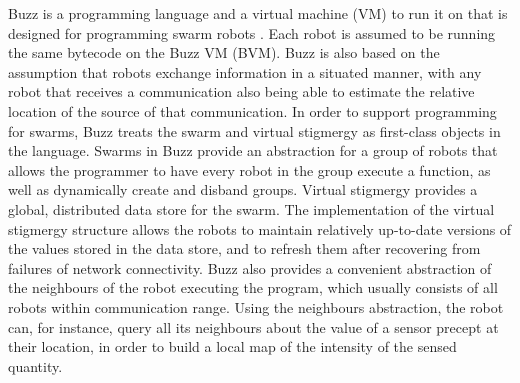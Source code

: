 Buzz is a programming language and a virtual machine (VM) to run it on that is designed for programming swarm robots \citep{PinciroliLB15}. 
Each robot is assumed to be running the same bytecode on the Buzz VM (BVM). 
Buzz is also based on the assumption that robots exchange information in a situated manner, with any robot that receives a communication also being able to estimate the relative location of the source of that communication.
In order to support programming for swarms, Buzz treats the swarm and virtual stigmergy as first-class objects in the language. 
Swarms in Buzz provide an abstraction for a group of robots that allows the programmer to have every robot in the group execute a function, as well as dynamically create and disband groups. 
Virtual stigmergy provides a global, distributed data store for the swarm. 
The implementation of the virtual stigmergy structure allows the robots to maintain relatively up-to-date versions of the values stored in the data store, and to refresh them after recovering from failures of network connectivity.
Buzz also provides a convenient abstraction of the neighbours of the robot executing the program, which usually consists of all robots within communication range. 
Using the neighbours abstraction, the robot can, for instance, query all its neighbours about the value of a sensor precept at their location, in order to build a local map of the intensity of the sensed quantity. 



